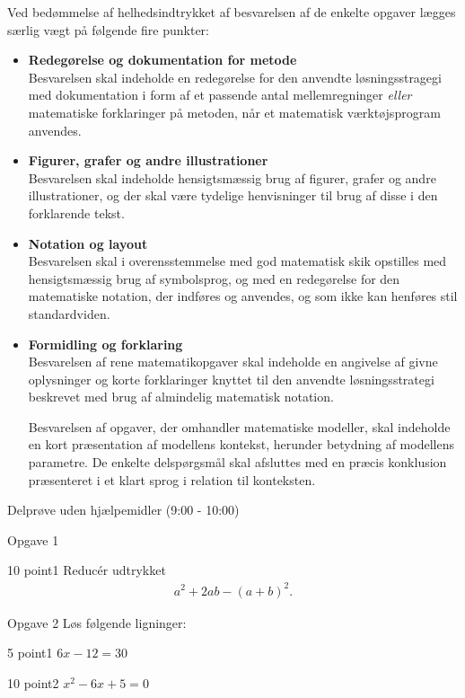 \documentclass[12pt,x11names]{article}
\begin{document}
Ved bedømmelse af helhedsindtrykket af besvarelsen af de enkelte opgaver lægges særlig vægt på følgende fire punkter:
\begin{itemize}
\item[$\cdot$] \textbf{Redegørelse og dokumentation for metode} \\
Besvarelsen skal indeholde en redegørelse for den anvendte løsningsstragegi med dokumentation i form af et passende antal mellemregninger \textit{eller} matematiske forklaringer på metoden, når et matematisk værktøjsprogram anvendes.
\item[$\cdot$] \textbf{Figurer, grafer og andre illustrationer} \\
Besvarelsen skal indeholde hensigtsmæssig brug af figurer, grafer og andre illustrationer, og der skal være tydelige henvisninger til brug af disse i den forklarende tekst.
\item[$\cdot$] \textbf{Notation og layout}\\
Besvarelsen skal i overensstemmelse med god matematisk skik opstilles med hensigtsmæssig brug af symbolsprog, og med en redegørelse for den matematiske notation, der indføres og anvendes, og som ikke kan henføres stil standardviden.
\item[$\cdot$] \textbf{Formidling og forklaring}\\
Besvarelsen af rene matematikopgaver skal indeholde en angivelse af givne oplysninger og korte forklaringer knyttet til den anvendte løsningsstrategi beskrevet med brug af almindelig matematisk notation. 

Besvarelsen af opgaver, der omhandler matematiske modeller, skal indeholde en kort præsentation af modellens kontekst, herunder betydning af modellens parametre. De enkelte delspørgsmål skal afsluttes med en præcis konklusion præsenteret i et klart sprog i relation til konteksten.
\end{itemize}

\newpage

\begin{center}
\Huge
Delprøve uden hjælpemidler (9:00 - 10:00)
\end{center}

\begin{opgavetekst}{Opgave 1}
\end{opgavetekst}
\begin{delopgave}{10 point}{1}
		Reducér udtrykket
		\begin{align*}
			a^2+2ab-(a+b)^2.
		\end{align*}	
\end{delopgave}
\begin{opgavetekst}{Opgave 2}
Løs følgende ligninger:
\end{opgavetekst}
\begin{delopgave}{5 point}{1}
	$6x-12=30$
\end{delopgave}
\begin{delopgave}{10 point}{2}
	$x^2-6x+5=0$
\end{delopgave}
\end{document}
